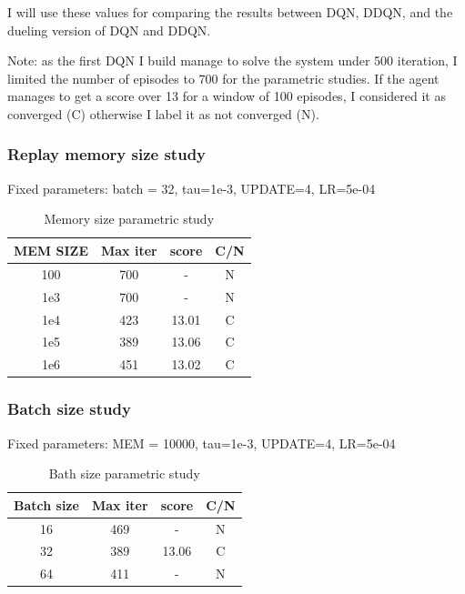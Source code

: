 \documentclass[12pt]{article}
\begin{document}
I will use these values for comparing the results between DQN, DDQN, and the dueling version of DQN and DDQN.

Note: as the first DQN I build manage to solve the system under 500 iteration, I limited the number of episodes to 700 for the parametric studies.  If the agent manages to get a score over 13 for a window of 100 episodes, I considered it as converged (C) otherwise I label it as not converged (N).


\subsubsection{Replay memory size study}
Fixed parameters: batch = 32, tau=1e-3, UPDATE=4, LR=5e-04

\begin{table}[H]
\centering
\begin{tabular}{|c|c|c|c|}
\hline 
{ \textbf{MEM SIZE}} & { \textbf{Max iter}} & { \textbf{score}} & { \textbf{C/N}} \\ \hline
100 & 700 & -     & N \\ \hline
1e3 & 700 & -     & N \\ \hline
1e4 & 423 & 13.01 & C \\ \hline
1e5 & 389 & 13.06 & C \\ \hline
1e6 & 451 & 13.02 & C \\ \hline
\end{tabular}
\caption{Memory size parametric study}
\label{table:Mem}
\end{table}



\subsubsection{Batch size study}
Fixed parameters: MEM = 10000, tau=1e-3, UPDATE=4, LR=5e-04

\begin{table}[H]
\centering
\begin{tabular}{|c|c|c|c|}
\hline
{\textbf{Batch size}} & {\textbf{Max iter}} & {\textbf{score}} & {\textbf{C/N}} \\ \hline
16 & 469 & -      & N \\ \hline
32  & 389 & 13.06 & C \\ \hline
64  & 411 & -     & N \\ \hline
\end{tabular}
\caption{Bath size parametric study}
\label{table:Batch}
\end{table}
\end{document}
